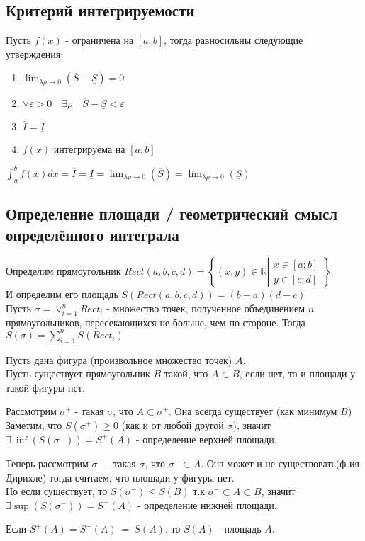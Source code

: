 \documentclass[11pt]{article}
\begin{document}
        \subsection{Критерий интегрируемости}
        Пусть $f(x)$ - ограничена на $[a; b]$, тогда равносильны следующие утверждения:
        \begin{enumerate}
            \item $\lim_{\lambda \rho \to 0} (\overline{S} - \underline{S}) = 0$
            \item $\forall \varepsilon > 0 \quad \exists \rho \quad \overline{S} - \underline{S} < \varepsilon$
            \item $\overline{I} = \underline{I}$
            \item $f(x)$ интегрируема на $[a; b]$ 
        \end{enumerate}
        $\int_{a}^{b} f(x)dx = \overline{I} = \underline{I} = \lim_{\lambda \rho \to 0} (\overline{S}) = \lim_{\lambda \rho \to 0} (\underline{S})$

        \subsection{Определение площади / геометрический смысл определённого интеграла}
        Определим прямоугольник $Rect(a, b, c, d) = \left\{ (x, y) \in \mathbb{R} \left\vert\begin{array}{l}
            x \in [a; b]\\
            y \in [c; d]
        \end{array}\right. \right\}$\\
        И определим его площадь $S(Rect(a, b, c, d)) = (b - a)(d - c)$\\
        Пусть $\sigma = \lor_{i = 1}^{n} Rect_i$ - множество точек, 
        полученное объединением $n$ прямоугольников, пересекающихся не больше, чем по стороне.
        Тогда $S(\sigma) = \sum_{i=1}^{n} S(Rect_i)$

        Пусть дана фигура (произвольное множество точек) $A$.\\
        Пусть существует прямоугольник $B$ такой, что $A \subset B$, если нет, то и площади у такой фигуры нет.

        Рассмотрим $\sigma^+$ - такая $\sigma$, что $A \subset \sigma^+$. Она всегда существует (как минимум $B$)\\
        Заметим, что $S(\sigma^+) \geq 0$ (как и от любой другой $\sigma$),
         значит $\exists\ \inf(S(\sigma^+)) = S^+(A)$ - определение верхней площади.

        Теперь рассмотрим $\sigma^-$ - такая $\sigma$, что $\sigma^- \subset A$. Она может и не существовать(ф-ия Дирихле)
         тогда считаем, что площади у фигуры нет.\\
        Но если существует, то $S(\sigma^-) \leq S(B)$ т.к $\sigma^- \subset A \subset B$, 
         значит $\exists \sup(S(\sigma^-)) = S^-(A)$ - определение нижней площади.

        Если $S^+(A) = S^-(A)\ =\ S(A)$, то $S(A)$ - площадь $A$.
        
\end{document}
